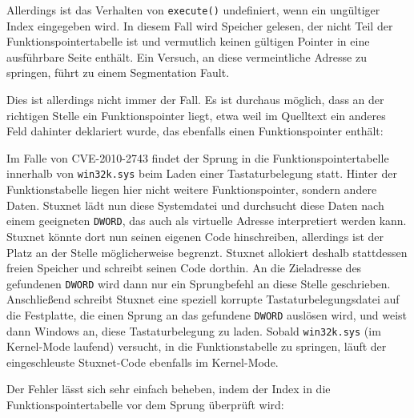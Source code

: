 \documentclass[a4paper]{article}
\begin{document}
Allerdings ist das Verhalten von \texttt{execute()} undefiniert, wenn ein ungültiger Index eingegeben wird.
In diesem Fall wird Speicher gelesen, der nicht Teil der Funktionspointertabelle ist und vermutlich keinen gültigen Pointer in eine ausführbare Seite enthält.
Ein Versuch, an diese vermeintliche Adresse zu springen, führt zu einem Segmentation Fault.

\begin{figure}[H]
  
\end{figure}

Dies ist allerdings nicht immer der Fall.
Es ist durchaus möglich, dass an der richtigen Stelle ein Funktionspointer liegt,
etwa weil im Quelltext ein anderes Feld dahinter deklariert wurde, das ebenfalls einen Funktionspointer enthält:

\begin{figure}[H]
  
\end{figure}

Im Falle von CVE-2010-2743 findet der Sprung in die Funktionspointertabelle innerhalb von \texttt{win32k.sys} beim Laden einer Tastaturbelegung statt.
Hinter der Funktionstabelle liegen hier nicht weitere Funktionspointer, sondern andere Daten.
Stuxnet lädt nun diese Systemdatei und durchsucht diese Daten nach einem geeigneten \texttt{DWORD}, das auch als virtuelle Adresse interpretiert werden kann.
Stuxnet könnte dort nun seinen eigenen Code hinschreiben, allerdings ist der Platz an der Stelle möglicherweise begrenzt.
Stuxnet allokiert deshalb stattdessen freien Speicher und schreibt seinen Code dorthin.
An die Zieladresse des gefundenen \texttt{DWORD} wird dann nur ein Sprungbefehl an diese Stelle geschrieben.
Anschließend schreibt Stuxnet eine speziell korrupte Tastaturbelegungsdatei auf die Festplatte, die einen Sprung an das gefundene \texttt{DWORD} auslösen wird,
und weist dann Windows an, diese Tastaturbelegung zu laden.
Sobald \texttt{win32k.sys} (im Kernel-Mode laufend) versucht, in die Funktionstabelle zu springen,
läuft der eingeschleuste Stuxnet-Code ebenfalls im Kernel-Mode.

Der Fehler lässt sich sehr einfach beheben, indem der Index in die Funktionspointertabelle vor dem Sprung überprüft wird:
\end{document}
